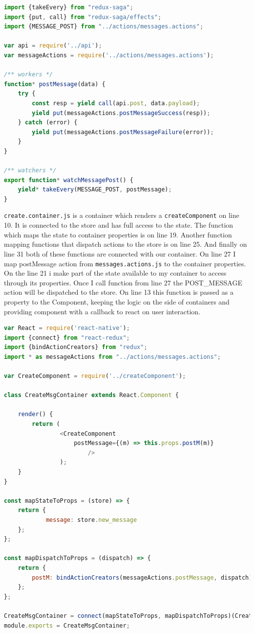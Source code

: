 \documentclass[thesis=M,english]{FITthesis}[2012/10/20]
\begin{document}
\begin{lstlisting}[language=JavaScript]
import {takeEvery} from "redux-saga";
import {put, call} from "redux-saga/effects";
import {MESSAGE_POST} from "../actions/messages.actions";

var api = require('../api');
var messageActions = require('../actions/messages.actions');

/** workers */
function* postMessage(data) {
    try {
        const resp = yield call(api.post, data.payload);
        yield put(messageActions.postMessageSuccess(resp));
    } catch (error) {
        yield put(messageActions.postMessageFailure(error));
    }
}

/** watchers */
export function* watchMessagePost() {
    yield* takeEvery(MESSAGE_POST, postMessage);
}
\end{lstlisting}

\verb|create.container.js| is a container which renders a \verb|createComponent| on line 10. It is connected to the store and has full access to the state. The function which maps the state to container properties is on line 19. Another function mapping functions that dispatch actions to the store is on line 25. And finally on line 31 both of these functions are connected with our container. On line 27 I map postMessage action from \verb|messages.actions.js| to the container properties. On the line 21 i make part of the state available to my container to access through its properties. Once I call function from line 27 the POST\_MESSAGE action will be dispatched to the store. On line 13 this function is passed as a property to the Component, keeping the logic on the side of containers and providing component with a callback to react on user interaction.

\begin{lstlisting}[language=JavaScript]
var React = require('react-native');
import {connect} from "react-redux";
import {bindActionCreators} from "redux";
import * as messageActions from "../actions/messages.actions";

var CreateComponent = require('../createComponent');

class CreateMsgContainer extends React.Component {

    render() {
        return ( 
        		<CreateComponent 
        			postMessage={(m) => this.props.postM(m)} 
						/>
				);
    }
}

const mapStateToProps = (store) => {
    return {
			message: store.new_message    
    };
};

const mapDispatchToProps = (dispatch) => {
    return {
        postM: bindActionCreators(messageActions.postMessage, dispatch)
    };
};

CreateMsgContainer = connect(mapStateToProps, mapDispatchToProps)(CreateMsgContainer);
module.exports = CreateMsgContainer;
\end{lstlisting}
\end{document}
